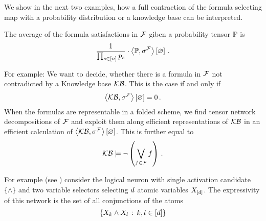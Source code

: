 
We show in the next two examples, how a full contraction of the formula selecting map with a probability distribution or a knowledge base can be interpreted.

\begin{example}
    The average of the formula satisfactions in $\mathcal{F}$ giben a probability tensor $\mathbb{P}$ is
    \[ \frac{1}{\prod_{s\in[n]}p_{s}} \cdot \left\langle \mathbb{P},\sigma^{\mathcal{F}}\right\rangle \left[ \varnothing \right] \, . \]
\end{example}


\begin{example}
    For example: We want to decide, whether there is a formula in $\mathcal{F}$ not contradicted by a Knowledge base $\mathcal{KB}$.
    This is the case if and only if
    \[ \left\langle \mathcal{KB},\sigma^{\mathcal{F}}\right\rangle \left[ \varnothing \right] = 0 \, .  \]
    When the formulas are representable in a folded scheme, we find tensor network decompositions of $\mathcal{F}$ and exploit them along efficient representations of $\mathcal{KB}$ in an efficient calculation of $\left\langle \mathcal{KB},\sigma^{\mathcal{F}}\right\rangle \left[ \varnothing \right] $.
    This is further equal to
    \[ \mathcal{KB} \models \lnot \left( \bigvee_{f\in\mathcal{F}} f\right) \, . \]
\end{example}


%










For example (see ) consider the logical neuron with single activation candidate $\{\land\}$ and two variable selectors selecting $d$ atomic variables $X_{[d]}$.
The expressivity of this network is the set of all conjunctions of the atoms
\[ \{X_{k} \land X_{l} \,:\, k,l\in[d] \} \]



